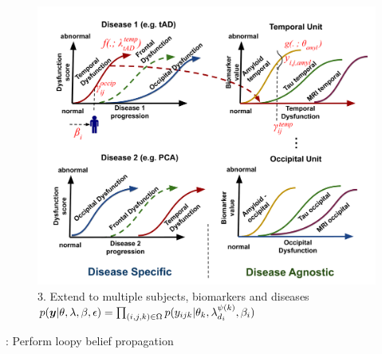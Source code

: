 \documentclass[portrait,a0,final,20pt]{a0poster}
\newcommand{\fnt}[1]{\LARGE{#1}}
\begin{document}
{\begin{multicols}{2}
\begin{figure}[H]
 \includegraphics[width=\columnwidth]{disease_knowledge_transfer_poster.pdf}
  \fnt{3. Extend to multiple subjects, biomarkers and diseases}\\
 $ p(\boldsymbol{y}|\theta, \lambda, \beta , \epsilon) = \prod_{(i,j,k) \in \Omega} p(y_{ijk}|\theta_k, \lambda_{d_i}^{\psi(k)}, \beta_{i}) $
 \end{figure}



: Perform loopy belief propagation


\newcommand{\uu}{^{(u)}}
\newcommand{\um}{^{(u-1)}}

\newcommand{\algoFnt}[1]{\Large{#1}}



\end{multicols}}
\end{document}
